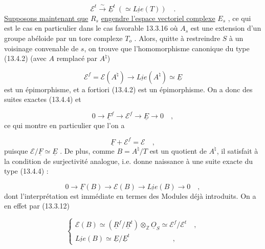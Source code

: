 
\begin{equation}\tag{13.4.11}
\mathcal{E}^t \stackrel{\sim}{\longrightarrow} \underline{E}^t \ ( \simeq \underline{Lie}(T)) \quad .
\end{equation}
\underline{Supposons maintenant que} $R_s$ \underline{engendre l'espace vectoriel complexe} $E_s$ , ce qui est le cas en particulier dans le cas favorable 13.3.16 où $A_s$ est une extension d'un groupe abéloide par un tore complexe $T_o$ . Alors, quitte à restreindre $S$ à un voisinage convenable de $s$, on trouve que l'homomorphisme canonique du type (13.4.2) (avec $A$ remplacé par $A^\natural$)

\begin{equation*}
\mathcal{E}^f = \mathcal{E}(A^\natural) \longrightarrow \underline{Lie}(A^\natural) \simeq \underline{E}
\end{equation*}
est un épimorphisme, et a fortiori (13.4.2) est un épimorphisme. On a donc des suites exactes (13.4.4) et

\begin{equation}\tag{13.4.12}
0 \longrightarrow \underline{F}^f \longrightarrow \mathcal{E}^f \longrightarrow \underline{E} \longrightarrow 0 \quad ,
\end{equation}
ce qui montre en particulier que l'on a

\begin{equation}\tag{13.4.13}
\underline{F} + \mathcal{E}^f = \mathcal{E} \quad ,
\end{equation}
puisque $\mathcal{E}/\underline{F} \simeq \underline{E}$ . De plus, comme $B = A^\natural/T$ est un quotient de $A^\natural$, il satisfait à la condition de surjectivité analogue, i.e. donne naissance à une suite exacte du type (13.4.4) :

\begin{equation}\tag{13.4.14}
0 \longrightarrow \underline{F}(B) \longrightarrow \mathcal{E}(B) \longrightarrow \underline{Lie}(B) \longrightarrow 0 \quad ,
\end{equation}
dont l'interprétation est immédiate en termes des Modules déjà introduits. On a en effet par (13.3.12)

\begin{equation}\tag{13.4.15}
\left\{ \begin{array}{l} \mathcal{E}(B) \simeq (\underline{R}^f / \underline{R}^t) \otimes_{\mathbb{Z}} \underline{O}_S \simeq \mathcal{E}^f / \mathcal{E}^t \quad , \\[3ex] \underline{Lie}(B) \simeq \underline{E} / \underline{E}^t \qquad\qquad\qquad , \end{array} \right.
\end{equation}

